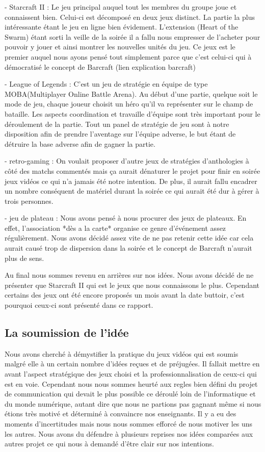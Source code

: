 - Starcraft II : Le jeu principal auquel tout les membres du groupe joue
et connaissent bien. Celui-ci est décomposé en deux jeux distinct.  La
partie la plus intéressante étant le jeu en ligne bien évidement.
L'extension (Heart of the Swarm) étant sorti la veille de la soirée il a
fallu nous empresser de l'acheter pour pouvoir y jouer et ainsi montrer
les nouvelles unités du jeu. Ce jeux est le premier auquel nous ayons
pensé tout simplement parce que c'est celui-ci qui à démocratisé le
concept de Barcraft (lien explication barcraft)

- League of Legends : C'est un jeu de stratégie en équipe de type
MOBA(Multiplayer Online Battle Arena). Au début d'une partie, quelque soit
le mode de jeu, chaque joueur choisit un héro qu'il va représenter sur 
le champ de bataille. Les aspects coordination et travaille d'équipe sont très
important pour le déroulement de la partie. Tout un panel de stratégie de jeu
sont à notre disposition afin de prendre l'aventage sur l'équipe adverse, le 
but étant de détruire la base adverse afin de gagner la partie.

- retro-gaming : On voulait proposer d'autre jeux de stratégies
d'anthologies à côté des matchs commentés mais ça aurait dénaturer le
projet pour finir en soirée jeux vidéos ce qui n'a jamais été notre
intention. De plus, il aurait fallu encadrer un nombre conséquent de
matériel durant la soirée ce qui aurait été dur à gérer à trois
personnes.

- jeu de plateau : Nous avons pensé à nous procurer des jeux de
plateaux. En effet, l'association *dès a la carte* organise ce genre
d'événement assez régulièrement. Nous avons décidé assez vite de ne pas
retenir cette idée car cela aurait causé trop de dispersion dans la
soirée et le concept de Barcraft n'aurait plus de sens.

Au final nous sommes revenu en arrières sur nos idées. Nous avons décidé
de ne présenter que Starcraft II qui est le jeux que nous connaissons le
plus. Cependant certains des jeux ont été encore proposés un mois avant
la date buttoir, c'est pourquoi ceux-ci sont présenté dans ce rapport.


\subsection{La soumission de l'idée}%
\label{sub:la_soumission_de_leidee}

Nous avons cherché à démystifier la pratique du jeux vidéos qui est
soumis malgré elle à un certain nombre d'idées reçues et de préjugées.
Il fallait mettre en avant l'aspect stratégique des jeux choisi et la
professionnalisation de ceux-ci qui est en voie. Cependant nous nous
sommes heurté aux regles bien défini du projet de communication qui
devait le plus possible ce déroulé loin de l'informatique et du monde
numérique, autant dire que nous ne partions pas gagnant même si nous
étions très motivé et déterminé à convaincre nos enseignants. Il y a eu
des moments d'incertitudes mais nous nous sommes efforcé de nous motiver
les uns les autres. Nous avons du défendre à plusieurs reprises nos
idées comparées aux autres projet ce qui nous à demandé d'être clair sur
nos intentions.


